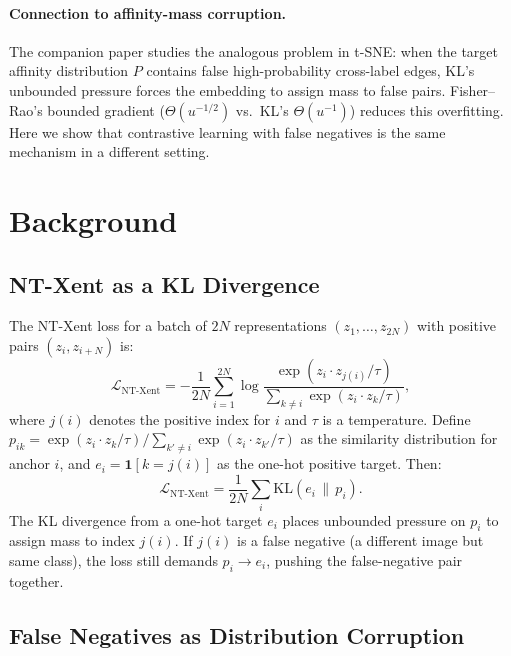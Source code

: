 \documentclass[11pt]{article}
\begin{document}
\paragraph{Connection to affinity-mass corruption.}
The companion paper \citep{bottoni2026fisherrao} studies the analogous problem in t-SNE:
when the target affinity distribution $P$ contains false high-probability cross-label edges,
KL's unbounded pressure forces the embedding to assign mass to false pairs. Fisher--Rao's
bounded gradient ($\Theta(u^{-1/2})$ vs.\ KL's $\Theta(u^{-1})$) reduces this overfitting.
Here we show that contrastive learning with false negatives is the same mechanism in
a different setting.

\section{Background}

\subsection{NT-Xent as a KL Divergence}

The NT-Xent loss for a batch of $2N$ representations $(z_1, \ldots, z_{2N})$ with positive
pairs $(z_i, z_{i+N})$ is:
\begin{equation}
  \mathcal{L}_{\mathrm{NT\text{-}Xent}}
  = -\frac{1}{2N}\sum_{i=1}^{2N}\log
    \frac{\exp(z_i \cdot z_{j(i)} / \tau)}
         {\sum_{k \ne i}\exp(z_i \cdot z_k / \tau)},
\end{equation}
where $j(i)$ denotes the positive index for $i$ and $\tau$ is a temperature. Define
$p_{ik} = \exp(z_i \cdot z_k/\tau)/\sum_{k'\ne i}\exp(z_i \cdot z_{k'}/\tau)$ as the
similarity distribution for anchor $i$, and $e_i = \mathbf{1}[k = j(i)]$ as the one-hot
positive target. Then:
\begin{equation}
  \mathcal{L}_{\mathrm{NT\text{-}Xent}} = \frac{1}{2N}\sum_i \mathrm{KL}(e_i \,\|\, p_i).
\end{equation}
The KL divergence from a one-hot target $e_i$ places unbounded pressure on $p_i$ to assign
mass to index $j(i)$. If $j(i)$ is a false negative (a different image but same class), the
loss still demands $p_i \to e_i$, pushing the false-negative pair together.

\subsection{False Negatives as Distribution Corruption}
\end{document}
